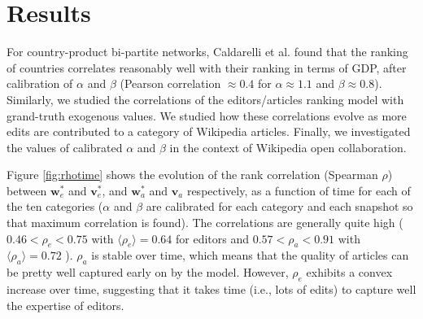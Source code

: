 \section{Results}
For country-product bi-partite networks,  Caldarelli et al. \cite{caldarelli2012network} found that the ranking of countries correlates reasonably well with their ranking in terms of GDP, after calibration of $\alpha$ and $\beta$ (Pearson correlation $\approx 0.4$ for $\alpha \approx 1.1$ and $\beta \approx 0.8$). Similarly, we studied the correlations of the editors/articles ranking model with grand-truth exogenous values. We studied how these correlations evolve as more edits are contributed to a category of Wikipedia articles. Finally, we investigated the values of calibrated $\alpha$ and $\beta$ in the context of Wikipedia open collaboration.

Figure \ref{fig:rhotime} shows the evolution of the rank correlation (Spearman $\rho$) between $\mathbf{w}^*_e$ and $\mathbf{v}^*_e$, and $\mathbf{w}^*_a$ and $\mathbf{v}_a$ respectively, as a function of time for each of the ten categories ($\alpha$ and $\beta$ are calibrated for each category and each snapshot so that maximum correlation is found). The correlations are generally quite high ( $ 0.46 < \rho_e < 0.75$ with $\langle \rho_e\rangle = 0.64$ for editors and $0.57 < \rho_a < 0.91$ with $\langle \rho_a\rangle = 0.72$ ). $\rho_{a}$  is stable over time, which means that the quality of articles can be pretty well captured early on by the model. However, $\rho_e$ exhibits a convex increase over time, suggesting that it takes time (i.e., lots of edits) to capture well the expertise of editors.

